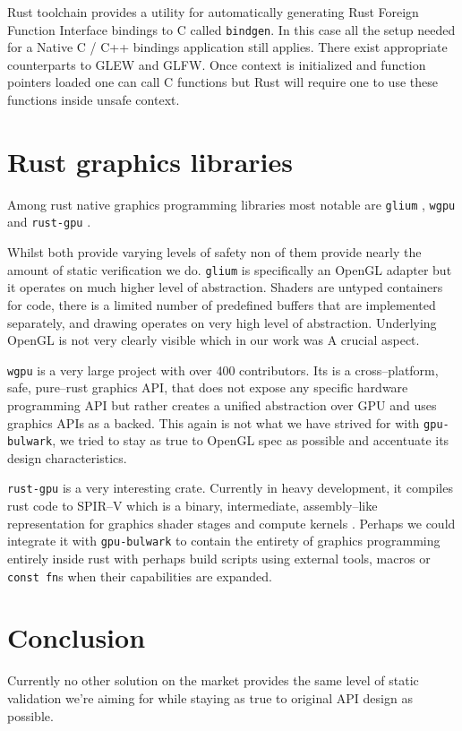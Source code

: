 Rust toolchain provides a utility for automatically generating Rust Foreign Function Interface bindings to C called \texttt{bindgen}.
In this case all the setup needed for a Native C / C++ bindings application still applies. There exist appropriate counterparts to GLEW and GLFW.
Once context is initialized and function pointers loaded one can call C functions but Rust will require one to use these functions inside unsafe context.

\section{Rust graphics libraries}

Among rust native graphics programming libraries most notable are \texttt{glium} \cite{gliumgithub}, \texttt{wgpu} \cite{wgpugithub} and \texttt{rust-gpu} \cite{rustgpugithub}.

Whilst both provide varying levels of safety non of them provide nearly the amount of static verification we do.
\texttt{glium} is specifically an OpenGL adapter but it operates on much higher level of abstraction.
Shaders are untyped containers for code, there is a limited number of predefined buffers that are implemented separately, 
and drawing operates on very high level of abstraction. Underlying OpenGL is not very clearly visible which in our work was A
crucial aspect.

\texttt{wgpu} is a very large project with over 400 contributors. Its is a cross--platform, safe, pure--rust graphics API, that
does not expose any specific hardware programming API but rather creates a unified abstraction over GPU and uses graphics APIs 
as a backed.
This again is not what we have strived for with \texttt{gpu-bulwark}, we tried to stay as true to OpenGL spec as possible
and accentuate its design characteristics.

\texttt{rust-gpu} is a very interesting crate. Currently in heavy development, it compiles rust code to SPIR--V which is a binary, intermediate, 
assembly--like representation for graphics shader stages and compute kernels \cite{spirvspec}.
Perhaps we could integrate it with \texttt{gpu-bulwark} to contain the entirety of graphics programming entirely inside rust 
with perhaps build scripts using external tools, macros or \texttt{const fn}s when their capabilities are expanded.

\section{Conclusion}

Currently no other solution on the market provides the same level of static validation we're aiming for
while staying as true to original API design as possible.
